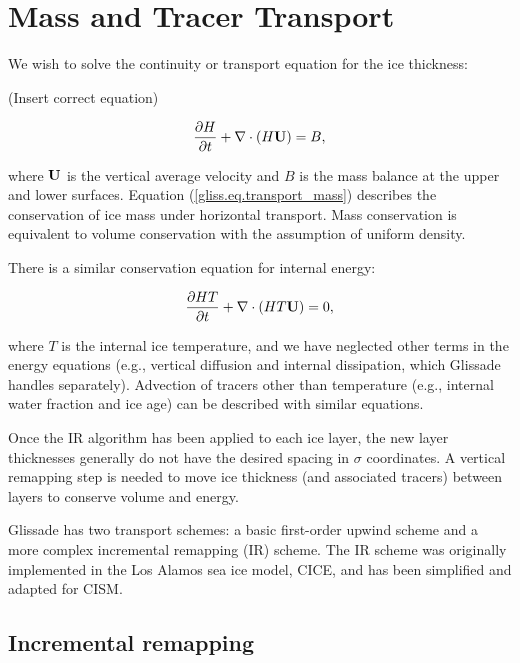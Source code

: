 \section{Mass and Tracer Transport}
\label{sc:glissade-transport}

We wish to solve the continuity or transport equation for the ice thickness:

(Insert correct equation)

\begin{equation}
  \label{gliss.eq.transport_mass}
  \frac{\partial H}{\partial t} + \nabla \cdot (H {\bf U}) = B,
\end{equation}

\noindent
where ${\bf U}$ is the vertical average velocity and $B$ is the 
mass balance at the upper and lower surfaces.
Equation (\ref{gliss.eq.transport_mass}) describes the conservation of
ice mass under horizontal transport.  
Mass conservation is equivalent to volume conservation with the assumption
of uniform density.

There is a similar conservation equation for internal energy:

\begin{equation}
  \label{gliss.eq.transport_energy}
  \frac{\partial{H T}}{\partial t} + \nabla \cdot (H T {\bf U}) = 0,
\end{equation}

where $T$ is the internal ice temperature, and we have neglected other terms in the
energy equations (e.g., vertical diffusion and internal dissipation, which Glissade handles
separately).
Advection of tracers other than temperature (e.g., internal water fraction and ice age)
can be described with similar equations.


Once the IR algorithm has been applied to each ice layer, the new layer thicknesses
generally do not have the desired spacing in $\sigma$ coordinates.
A vertical remapping step is needed to move ice thickness (and associated
tracers) between layers to conserve volume and energy.

Glissade has two transport schemes: a basic first-order
upwind scheme and a more complex incremental remapping (IR) scheme.
The IR scheme \citep{Dukowicz2000, Lipscomb2004} 
was originally implemented in the Los Alamos sea ice model, CICE,
and has been simplified and adapted for CISM.  

\subsection{Incremental remapping}
\label{sc:incremental_remapping}

